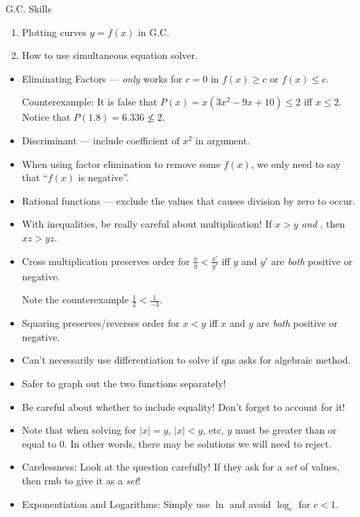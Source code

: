 \documentclass[oneside]{book}
\begin{document}
\begin{lbox}[colbacktitle=white, coltitle=black, colframe=black]{G.C. Skills} 
  \begin{enumerate}
    \item Plotting curves \(y=f(x)\) in G.C.
    \item How to use simultaneous equation solver.
  \end{enumerate}
\end{lbox}
\begin{IN}
  \begin{itemize}
    \item Eliminating Factors --- \emph{only} works for \(c=0\) in \(f(x) \geq c\) or \(f(x) \leq c\).

    Counterexample: It is false that \(P(x)=x(3x^2-9x+10) \leq 2\) iff \(x \leq 2\). Notice that \(P(1.8)=6.336 \not\leq 2\). 
    \item Discriminant --- include coefficient of \(x^2\) in argument.
    \item When using factor elimination to remove some \(f(x)\), we only need to say that ``\(f(x)\) is negative''.
    \item Rational functions --- exclude the values that causes division by zero to occur.
    \item With inequalities, be really careful about multiplication! If \(x>y\) \emph{and} , then \(xz>yz\). 
    \item Cross multiplication preserves order for \(\frac{x}{y}<\frac{x'}{y'}\) iff \(y\) and \(y'\) are \emph{both} positive or negative.
    
    Note the counterexample \(\frac{1}{2}<\frac{1}{-3}\).
    \item Squaring preserves/reverses order for \(x<y\) iff \(x\) and \(y\) are \emph{both} positive or negative.
    \item Can't necessarily use differentiation to solve if qns asks for algebraic method.
    \item Safer to graph out the two functions separately!
    \item Be careful about whether to include equality! Don't forget to account for it!
    \item  Note that when solving for \(\lvert x \rvert=y\), \(\lvert x \rvert < y\), etc, \(y\) must be greater than or equal to 0. In other words, there may be solutions we will need to reject.
    \item Carelessness: Look at the question carefully! If they ask for a \emph{set} of values, then rmb to give it as a \emph{set}!
    \item Exponentiation and Logarithms: Simply use \(\ln\) and avoid \(\log_c\) for \(c<1\).
    

\end{itemize}
\end{IN}
\end{document}
